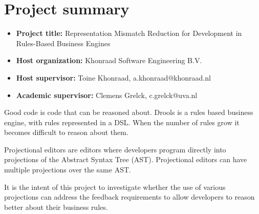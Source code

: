 \section{Project summary}

\begin{itemize}
    \item \textbf{Project title:} Representation Mismatch Reduction for Development in Rules-Based Business Engines
    \item \textbf{Host organization:} Khonraad Software Engineering B.V. 
    \item \textbf{Host supervisor:} Toine Khonraad, a.khonraad@khonraad.nl
    \item \textbf{Academic supervisor:} Clemens Grelck, c.grelck@uva.nl
\end{itemize}

Good code is code that can be reasoned about.
Drools is a rules based business engine, with rules represented in a DSL.
When the number of rules grow it becomes difficult to reason about them.

Projectional editors are editors where developers program directly into projections of the Abstract Syntax Tree (AST).
Projectional editors can have multiple projections over the same AST.

It is the intent of this project to investigate whether the use of various projections can address the feedback requirements to allow developers to reason better about their business rules.